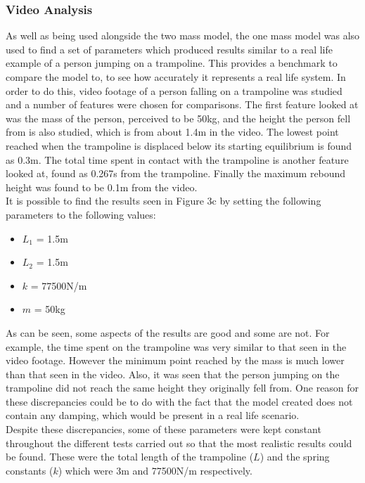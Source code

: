 \subsubsection{Video Analysis}\label{vid}
\noindent As well as being used alongside the two mass model, the one mass model was also used to find a set of parameters which produced results similar to a real life example of a person jumping on a trampoline. This provides a benchmark to compare the model to, to see how accurately it represents a real life system. In order to do this, video footage of a person falling on a trampoline was studied \cite{vidya} and a number of features were chosen for comparisons. The first feature looked at was the mass of the person, perceived to be 50kg, and the height the person fell from is also studied, which is from about 1.4m in the video. The lowest point reached when the trampoline is displaced below its starting equilibrium is found as 0.3m. The total time spent in contact with the trampoline is another feature looked at, found as 0.267s from the trampoline. Finally the maximum rebound height was found to be 0.1m from the video.\\

\noindent It is possible to find the results seen in Figure 3c by setting the following parameters to the following values:
\begin{itemize}
\item $L_1$ = 1.5m
\item $L_2$ = 1.5m
\item $k$ = 77500N/m
\item $m$ = 50kg
\end{itemize}

\noindent As can be seen, some aspects of the results are good and some are not. For example, the time spent on the trampoline was very similar to that seen in the video footage. However the minimum point reached by the mass is much lower than that seen in the video. Also, it was seen that the person jumping on the trampoline did not reach the same height they originally fell from. One reason for these discrepancies could be to do with the fact that the model created does not contain any damping, which would be present in a real life scenario. \\

\noindent Despite these discrepancies, some of these parameters were kept constant throughout the different tests carried out so that the most realistic results could be found. These were the total length of the trampoline ($L$) and the spring constants ($k$) which were 3m and 77500N/m respectively.




